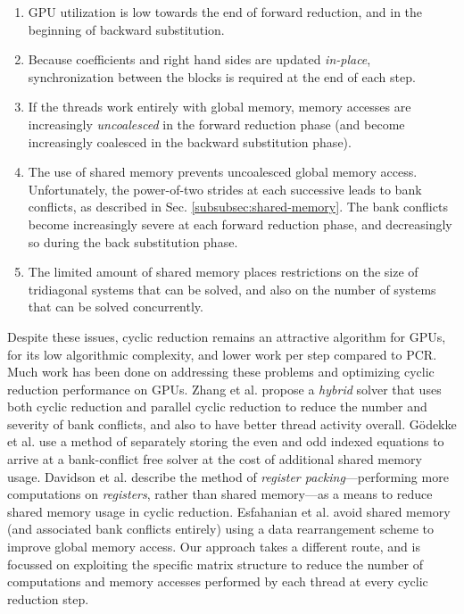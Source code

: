\begin{enumerate}
\item GPU utilization is low towards the end of forward reduction,
    and in the beginning of backward substitution.

\item Because coefficients and right hand sides
    are updated \emph{in-place},
    synchronization between the blocks is required at
    the end of each step.

\item If the threads work entirely with global memory,
    memory accesses are increasingly
    \emph{uncoalesced} in the forward reduction phase
    (and become increasingly coalesced in the
    backward substitution phase).

\item The use of shared memory prevents
    uncoalesced global memory access.
    Unfortunately,
    the power-of-two strides at each successive
    leads to bank conflicts,
    as described in Sec. \ref{subsubsec:shared-memory}.
    The bank conflicts become increasingly severe
    at each forward reduction phase,
    and decreasingly so during the back substitution phase.
    
\item The limited amount of shared memory places restrictions
    on the size of tridiagonal systems that can be solved,
    and also on the number of systems that can be solved
    concurrently.
\end{enumerate}

Despite these issues,
cyclic reduction remains an attractive algorithm
for GPUs,
for its low algorithmic complexity,
and lower work per step compared to PCR.
Much work has been done on
addressing these problems and
optimizing cyclic reduction performance on GPUs.
Zhang et al. \cite{Zhang2010FTS} propose a
\emph{hybrid} solver
that uses both cyclic reduction and parallel cyclic reduction
to reduce the number and severity of bank conflicts,
and also to have better thread activity overall.
G{\"o}dekke et al. \cite{GoSt11CR}
use a method of separately storing
the even and odd indexed equations
to arrive at a bank-conflict free solver
at the cost of additional shared memory usage.
Davidson et al. \cite{davidson2011register}
describe the method of
\emph{register packing}---performing more computations
on \emph{registers}, rather than shared memory---as
a means to reduce shared memory usage in cyclic reduction.
Esfahanian et al. \cite{esfahanian2014efficient}
avoid shared memory (and associated bank conflicts entirely)
using a data rearrangement scheme to improve global memory access.
Our approach takes a different route,
and is focussed on exploiting the specific matrix structure
to reduce the number of computations and memory accesses
performed by each thread
at every cyclic reduction step.
